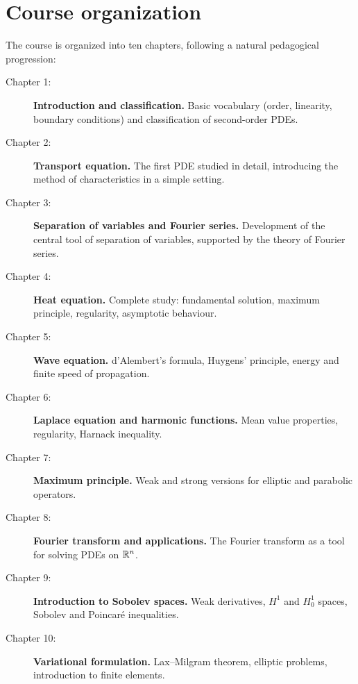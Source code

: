 \section*{Course organization}

The course is organized into ten chapters, following a natural pedagogical
progression:

\begin{description}
    \item[Chapter 1:] \textbf{Introduction and classification.} Basic vocabulary
        (order, linearity, boundary conditions) and classification of
        second-order PDEs.

    \item[Chapter 2:] \textbf{Transport equation.} The first PDE studied in
        detail, introducing the method of characteristics in a simple setting.

    \item[Chapter 3:] \textbf{Separation of variables and Fourier series.}
        Development of the central tool of separation of variables, supported
        by the theory of Fourier series.

    \item[Chapter 4:] \textbf{Heat equation.} Complete study: fundamental
        solution, maximum principle, regularity, asymptotic behaviour.

    \item[Chapter 5:] \textbf{Wave equation.} d'Alembert's formula, Huygens'
        principle, energy and finite speed of propagation.

    \item[Chapter 6:] \textbf{Laplace equation and harmonic functions.}
        Mean value properties, regularity, Harnack inequality.

    \item[Chapter 7:] \textbf{Maximum principle.} Weak and strong versions for
        elliptic and parabolic operators.

    \item[Chapter 8:] \textbf{Fourier transform and applications.}
        The Fourier transform as a tool for solving PDEs on $\mathbb{R}^n$.

    \item[Chapter 9:] \textbf{Introduction to Sobolev spaces.}
        Weak derivatives, $H^1$ and $H^1_0$ spaces, Sobolev and Poincar\'e
        inequalities.

    \item[Chapter 10:] \textbf{Variational formulation.}
        Lax--Milgram theorem, elliptic problems, introduction to finite
        elements.
\end{description}

